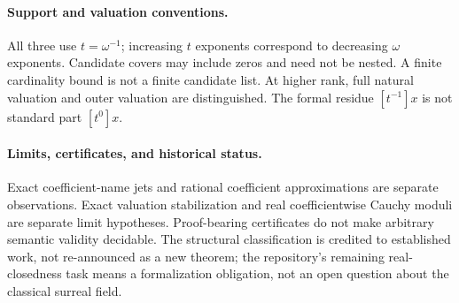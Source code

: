 \documentclass[11pt,letterpaper]{article}
\numberwithin{equation}{section}
\theoremstyle{definition}
\theoremstyle{remark}
\begin{document}
\paragraph{Support and valuation conventions.}
All three use $t=\omega^{-1}$; increasing $t$ exponents correspond to
 decreasing $\omega$ exponents. Candidate covers may include zeros and need
not be nested. A finite cardinality bound is not a finite candidate list.
At higher rank, full natural valuation and outer valuation are distinguished.
The formal residue $[t^{-1}]x$ is not standard part $[t^0]x$.

\paragraph{Limits, certificates, and historical status.}
Exact coefficient-name jets and rational coefficient approximations are
separate observations. Exact valuation stabilization and real coefficientwise
Cauchy moduli are separate limit hypotheses. Proof-bearing certificates do
not make arbitrary semantic validity decidable. The structural classification
is credited to established work, not re-announced as a new theorem; the
repository's remaining real-closedness task means a formalization obligation,
not an open question about the classical surreal field.
\end{document}
